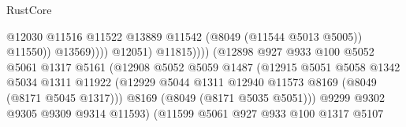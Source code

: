 \begin{lexlean}{RustCore}
\begin{coremodule}
                                                          @12030
                                                          @11516
                                                          @11522
                                                          @13889
                                                          @11542
                                                          (@8049 (@11544 @5013 @5005))
                                                          @11550))
                                                      @13569))))
                                              @12051)
                                            @11815))))
                                    (@12898
                                      @927
                                      @933
                                      @100
                                      @5052
                                      @5061
                                      @1317
                                      @5161
                                      (@12908
                                        @5052
                                        @5059
                                        @1487
                                        (@12915
                                          @5051
                                          @5058
                                          @1342
                                          @5034
                                          @1311
                                          @11922
                                          (@12929
                                            @5044
                                            @1311
                                            @12940
                                            @11573
                                            @8169
                                            (@8049 (@8171 @5045 @1317)))
                                          @8169
                                          (@8049 (@8171 @5035 @5051)))
                                        @9299
                                        @9302
                                        @9305
                                        @9309
                                        @9314
                                        @11593)
                                      (@11599
                                        @5061
                                        @927
                                        @933
                                        @100
                                        @1317
                                        @5107

\end{coremodule}
\end{lexlean}

